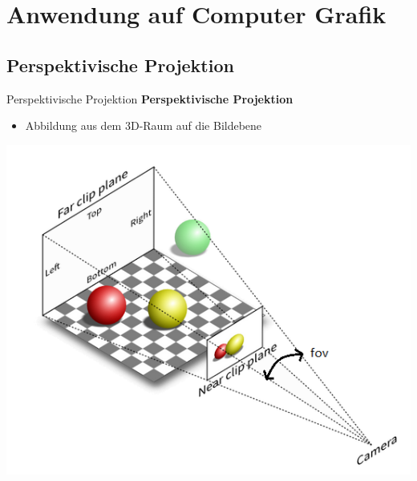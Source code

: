 \documentclass[10pt,aspectratio=169]{beamer}
\begin{document}
  \section{Anwendung auf Computer Grafik}


  \subsection{Perspektivische Projektion}
  \begin{frame}{Perspektivische Projektion}
    \textbf{Perspektivische Projektion}
    \begin{itemize}
      \item Abbildung aus dem 3D-Raum auf die Bildebene
    \end{itemize}
    \begin{center}
      \includegraphics[scale=0.65]{projektion}  
    \end{center}
  \end{frame}
\end{document}
